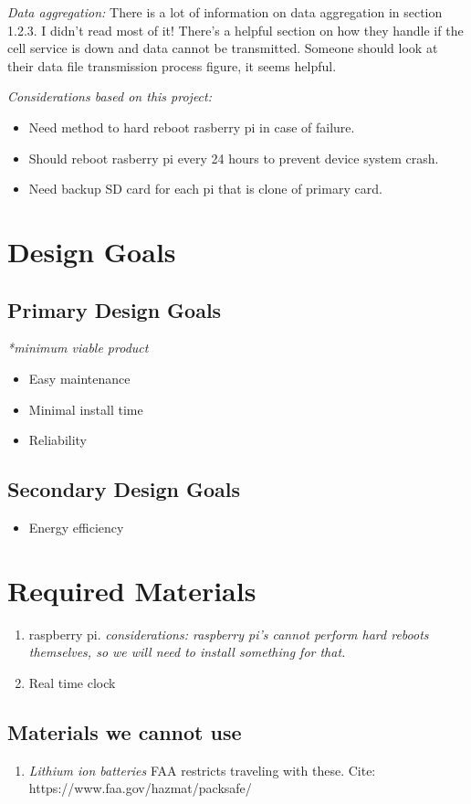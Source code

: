 \documentclass[12pt, letterpaper]{article}
\begin{document}
\textit{Data aggregation:} There is a lot of information on data aggregation in section 1.2.3.
%
I didn't read most of it!
%
There's a helpful section on how they handle if the cell service is down and data cannot be transmitted.
%
Someone should look at their data file transmission process figure, it seems helpful.


\textit{Considerations based on this project:}
%
\begin{itemize}
%
\item Need method to hard reboot rasberry pi in case of failure.
\item Should reboot rasberry pi every 24 hours to prevent device system crash.
\item Need backup SD card for each pi that is clone of primary card.
%
\end{itemize}


\section{Design Goals}
%
\subsection{Primary Design Goals}
%
\textit{*minimum viable product}
%
\begin{itemize}
%
\item Easy maintenance
%
\item Minimal install time
%
\item Reliability
%
\end{itemize}
%

\subsection{Secondary Design Goals}
%
\begin{itemize}
%
\item Energy efficiency
%
\end{itemize}


\section{Required Materials}
\begin{enumerate}
\item raspberry pi. \textit{considerations: raspberry pi's cannot perform hard reboots themselves,
so we will need to install something for that.}
\item Real time clock
\end{enumerate}

\subsection{Materials we cannot use}
\begin{enumerate}
\item \textit{Lithium ion batteries} FAA restricts traveling with these. Cite: https://www.faa.gov/hazmat/packsafe/
\end{enumerate}
\end{document}
